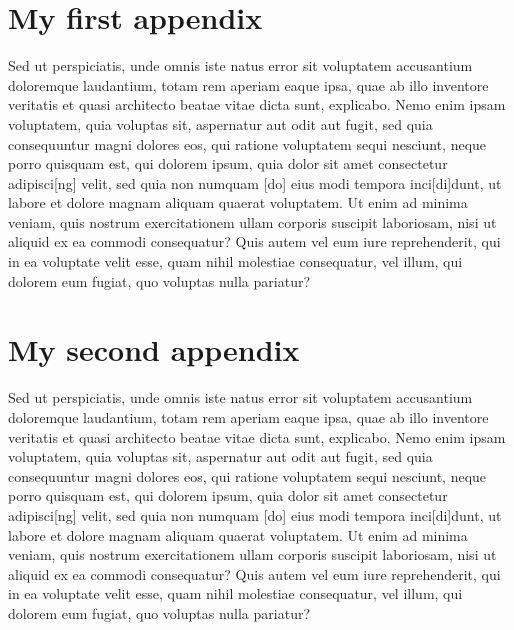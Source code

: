 \documentclass[a4paper,11pt]{article}
\begin{document}
\appendix

\section{My first appendix }

Sed ut perspiciatis, unde omnis iste natus error sit voluptatem accusantium doloremque laudantium, totam rem aperiam eaque ipsa, quae ab illo inventore veritatis et quasi architecto beatae vitae dicta sunt, explicabo. Nemo enim ipsam voluptatem, quia voluptas sit, aspernatur aut odit aut fugit, sed quia consequuntur magni dolores eos, qui ratione voluptatem sequi nesciunt, neque porro quisquam est, qui dolorem ipsum, quia dolor sit amet consectetur adipisci[ng] velit, sed quia non numquam [do] eius modi tempora inci[di]dunt, ut labore et dolore magnam aliquam quaerat voluptatem. Ut enim ad minima veniam, quis nostrum exercitationem ullam corporis suscipit laboriosam, nisi ut aliquid ex ea commodi consequatur? Quis autem vel eum iure reprehenderit, qui in ea voluptate velit esse, quam nihil molestiae consequatur, vel illum, qui dolorem eum fugiat, quo voluptas nulla pariatur?


\section{My second appendix }


Sed ut perspiciatis, unde omnis iste natus error sit voluptatem accusantium doloremque laudantium, totam rem aperiam eaque ipsa, quae ab illo inventore veritatis et quasi architecto beatae vitae dicta sunt, explicabo. Nemo enim ipsam voluptatem, quia voluptas sit, aspernatur aut odit aut fugit, sed quia consequuntur magni dolores eos, qui ratione voluptatem sequi nesciunt, neque porro quisquam est, qui dolorem ipsum, quia dolor sit amet consectetur adipisci[ng] velit, sed quia non numquam [do] eius modi tempora inci[di]dunt, ut labore et dolore magnam aliquam quaerat voluptatem. Ut enim ad minima veniam, quis nostrum exercitationem ullam corporis suscipit laboriosam, nisi ut aliquid ex ea commodi consequatur? Quis autem vel eum iure reprehenderit, qui in ea voluptate velit esse, quam nihil molestiae consequatur, vel illum, qui dolorem eum fugiat, quo voluptas nulla pariatur?





\end{document}
